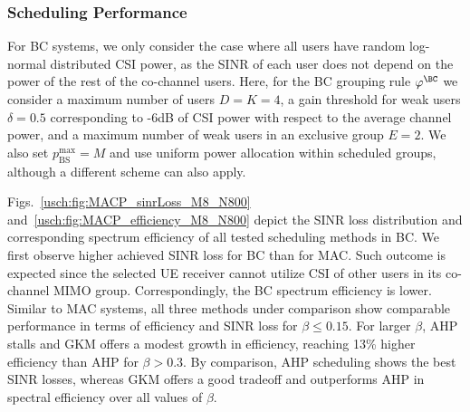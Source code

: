 \subsubsection{Scheduling Performance}
For BC systems, we only consider the case where all users have random log-normal distributed CSI power, as the SINR of each user does not depend on the power of the rest of the co-channel users.
Here, for the BC grouping rule $\varphi^{\BC}$ we consider a maximum number of users $D=K=4$, a gain threshold for weak users $\delta=0.5$ corresponding to -6dB of CSI power with respect to the average channel power, and a maximum number of weak users in an exclusive group $E=2$. We also set $p_{\mathrm{BS}}^{\mathrm{max}}=M$ and use uniform power allocation within scheduled groups, although a different scheme can also apply.

Figs.~\ref{usch:fig:MACP_sinrLoss_M8_N800} and~\ref{usch:fig:MACP_efficiency_M8_N800} depict the SINR loss distribution and corresponding spectrum efficiency of all tested scheduling methods in BC. 
We first observe higher achieved SINR loss for BC than for MAC.
Such outcome is expected since the selected UE receiver cannot utilize CSI of other users in its co-channel MIMO group. 
Correspondingly, the BC spectrum efficiency is lower.
Similar to MAC systems, all three methods under comparison show comparable performance in terms of efficiency and SINR loss for $\beta\leq0.15$. 
For larger $\beta$, AHP stalls and GKM offers a modest growth in efficiency, reaching 13\% higher efficiency than AHP for $\beta>0.3$. 
By comparison, AHP scheduling shows the best SINR losses, whereas GKM offers a good tradeoff and outperforms AHP in spectral efficiency over all values of $\beta$.

